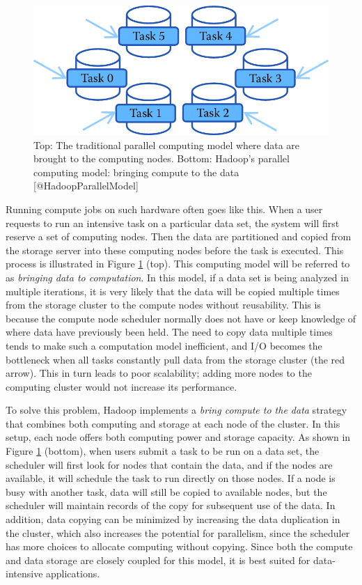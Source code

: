 \documentclass[]{krantz}
\begin{document}
\begin{figure}

{\centering \includegraphics[width=0.7\linewidth]{ChapterParallel/figures/compute2data} 

}

\caption{Top: The traditional parallel computing model where data are brought to the computing nodes. Bottom: Hadoop’s parallel computing model: bringing compute to the data [@HadoopParallelModel]}\label{fig:fig5-1a}
\end{figure}

Running compute jobs on such hardware often goes like this. When a user
requests to run an intensive task on a particular data set, the system
will first reserve a set of computing nodes. Then the data are
partitioned and copied from the storage server into these computing
nodes before the task is executed. This process is illustrated in Figure
\ref{fig:fig5-1a} (top). This computing model will be referred to as
\emph{bringing data to computation}. In this model, if a data set is
being analyzed in multiple iterations, it is very likely that the data
will be copied multiple times from the storage cluster to the compute
nodes without reusability. This is because the compute node scheduler
normally does not have or keep knowledge of where data have previously
been held. The need to copy data multiple times tends to make such a
computation model inefficient, and I/O becomes the bottleneck when all
tasks constantly pull data from the storage cluster (the red arrow).
This in turn leads to poor scalability; adding more nodes to the
computing cluster would not increase its performance.

To solve this problem, Hadoop implements a \emph{bring compute to the
data} strategy that combines both computing and storage at each node of
the cluster. In this setup, each node offers both computing power and
storage capacity. As shown in Figure \ref{fig:fig5-1a} (bottom), when
users submit a task to be run on a data set, the scheduler will first
look for nodes that contain the data, and if the nodes are available, it
will schedule the task to run directly on those nodes. If a node is busy
with another task, data will still be copied to available nodes, but the
scheduler will maintain records of the copy for subsequent use of the
data. In addition, data copying can be minimized by increasing the data
duplication in the cluster, which also increases the potential for
parallelism, since the scheduler has more choices to allocate computing
without copying. Since both the compute and data storage are closely
coupled for this model, it is best suited for data-intensive
applications.
\end{document}
